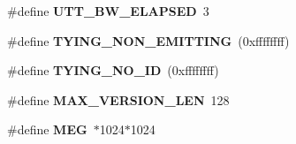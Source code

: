 \begin{DoxyCompactItemize}
\item 
\#define {\bfseries \-U\-T\-T\-\_\-\-B\-W\-\_\-\-E\-L\-A\-P\-S\-E\-D}~3\label{s3types_8h_a2bebd5b021cff915ca1f5fbd14c8b713}

\item 
\#define {\bfseries \-T\-Y\-I\-N\-G\-\_\-\-N\-O\-N\-\_\-\-E\-M\-I\-T\-T\-I\-N\-G}~(0xffffffff)\label{s3types_8h_addff2fcea68aef52d64b250b009f7187}

\item 
\#define {\bfseries \-T\-Y\-I\-N\-G\-\_\-\-N\-O\-\_\-\-I\-D}~(0xffffffff)\label{s3types_8h_a786a115928c98abbd3d4e5ac1bd6196f}

\item 
\#define {\bfseries \-M\-A\-X\-\_\-\-V\-E\-R\-S\-I\-O\-N\-\_\-\-L\-E\-N}~128\label{s3types_8h_ae84b1f33bc9f68e107cbe4834cf853ca}

\item 
\#define {\bfseries \-M\-E\-G}~$\ast$1024$\ast$1024\label{s3types_8h_a0faa13de5fe0bfac49a962ca59c3e047}

\end{DoxyCompactItemize}
